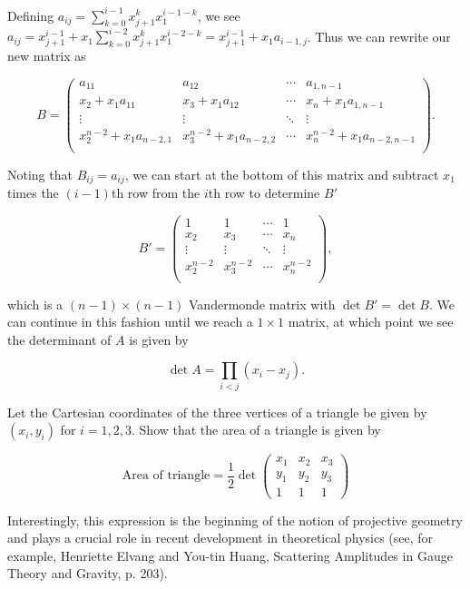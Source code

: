 \documentclass[../group-theory-in-a-nutshell-for-physicists.tex]{subfiles}
\begin{document}
\begin{questions}
\begin{solution}
Defining $a_{ij} = \sum_{k = 0}^{i - 1}x_{j+1}^{k}x_{1}^{i - 1 - k}$, we
see
$a_{ij} = x_{j+1}^{i - 1} + x_{1}\sum_{k = 0}^{i - 2}x_{j+1}^{k}x_{1}^{i - 2 - k} = x_{j+1}^{i - 1} + x_{1}a_{i - 1,j}$.
Thus we can rewrite our new matrix as

\[
B = \begin{pmatrix}
a_{11} & a_{12} & \cdots & a_{1,n-1} \\
x_{2} + x_{1}a_{11} & x_{3} + x_{1}a_{12} & \cdots & x_{n} + x_{1}a_{1,n-1} \\
 \vdots & \vdots & \ddots & \vdots \\
x_{2}^{n - 2} + x_{1}a_{n - 2,1} & x_{3}^{n - 2} + x_{1}a_{n - 2,2} & \cdots & x_{n}^{n - 2} + x_{1}a_{n - 2,n-1} \\
\end{pmatrix}.
\]

Noting that $B_{ij} = a_{ij}$, we can start at the bottom of this matrix and subtract $x_{1}$ times the $(i - 1)$th row from the $i$th row to determine $B'$

\[
B' = \begin{pmatrix}
1 & 1 & \cdots & 1 \\
x_{2} & x_{3} & \cdots & x_{n} \\
 \vdots & \vdots & \ddots & \vdots \\
x_{2}^{n - 2} & x_{3}^{n - 2} & \cdots & x_{n}^{n - 2} \\
\end{pmatrix},\]

which is a $(n - 1) \times (n - 1)$ Vandermonde matrix with $\det{B'} = \det{B}$. We can
continue in this fashion until we reach a \(1 \times 1\) matrix, at
which point we see the determinant of $A$ is given by

\[
\det{A} = \prod_{i < j}(x_{i} - x_{j}).
\]
\end{solution}

\question Let the Cartesian coordinates of the three vertices of a triangle be
given by $(x_{i},y_{i})$ for $i = 1,2,3$. Show that the area of a
triangle is given by

\[
\text{Area of triangle} = \frac{1}{2}\det\begin{pmatrix}
x_{1} & x_{2} & x_{3} \\
y_{1} & y_{2} & y_{3} \\
1 & 1 & 1
\end{pmatrix}
\]

Interestingly, this expression is the beginning of the notion of
projective geometry and plays a crucial role in recent development in
theoretical physics (see, for example, Henriette Elvang and You-tin
Huang, Scattering Amplitudes in Gauge Theory and Gravity, p. 203).


\end{questions}
\end{document}
